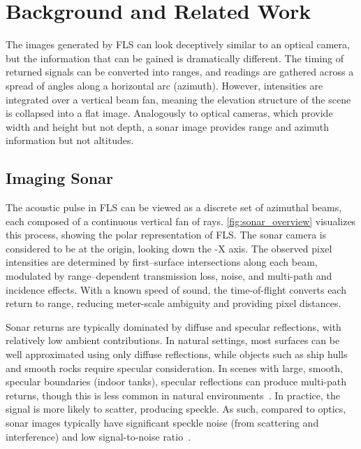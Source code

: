 \section{Background and Related Work}
\label{sec:background}

The images generated by FLS can look deceptively similar to an optical camera, but the information that can be gained is dramatically different. The timing of returned signals can be converted into ranges, and readings are gathered across a spread of angles along a horizontal arc (azimuth). However, intensities are integrated over a vertical beam fan, meaning the elevation structure of the scene is collapsed into a flat image. Analogously to optical cameras, which provide width and height but not depth, a sonar image provides range and azimuth information but not altitudes.

\subsection{Imaging Sonar}
\label{sec:imaging_sonar_bg}
The acoustic pulse in FLS can be viewed as a discrete set of azimuthal beams, each composed of a continuous vertical fan of rays. \cref{fig:sonar_overview} visualizes this process, showing the polar representation of FLS. The sonar camera is considered to be at the origin, looking down the -X axis. The observed pixel intensities are determined by first–surface intersections along each beam, modulated by range–dependent transmission loss, noise, and multi-path and incidence effects. With a known speed of sound, the time-of-flight converts each return to range, reducing meter-scale ambiguity and providing pixel distances.

Sonar returns are typically dominated by diffuse and specular reflections, with relatively low ambient contributions. In natural settings, most surfaces can be well approximated using only diffuse reflections, while objects such as ship hulls and smooth rocks require specular consideration. In scenes with large, smooth, specular boundaries (\eg indoor tanks), specular reflections can produce multi-path returns, though this is less common in natural environments~\citep{Wang2023Multipath}. In practice, the signal is more likely to scatter, producing speckle. As such, compared to optics, sonar images typically have significant speckle noise (from scattering and interference) and low signal-to-noise ratio~\cite{Huang2020}.


